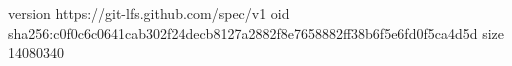 version https://git-lfs.github.com/spec/v1
oid sha256:c0f0c6c0641cab302f24decb8127a2882f8e7658882ff38b6f5e6fd0f5ca4d5d
size 14080340
